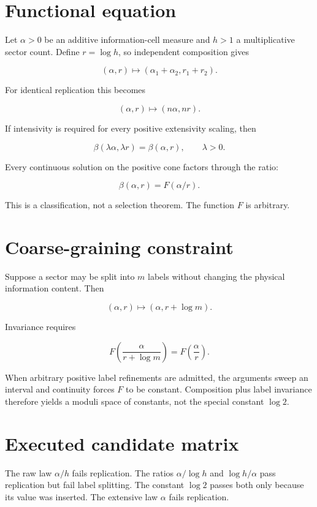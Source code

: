 \documentclass[11pt,a4paper,openany]{report}
\begin{document}
\section{Functional equation}

Let \(\alpha>0\) be an additive information-cell measure and \(h>1\) a multiplicative sector count. Define \(r=\log h\), so independent composition gives

\[
(\alpha,r)\mapsto(\alpha_1+\alpha_2,r_1+r_2).
\]

For identical replication this becomes

\[
(\alpha,r)\mapsto(n\alpha,nr).
\]

If intensivity is required for every positive extensivity scaling, then

\[
\beta(\lambda\alpha,\lambda r)=\beta(\alpha,r),
\qquad\lambda>0.
\]

Every continuous solution on the positive cone factors through the ratio:

\[
\beta(\alpha,r)=F(\alpha/r).
\]

This is a classification, not a selection theorem. The function \(F\) is arbitrary.

\section{Coarse-graining constraint}

Suppose a sector may be split into \(m\) labels without changing the physical information content. Then

\[
(\alpha,r)\mapsto(\alpha,r+\log m).
\]

Invariance requires

\[
F\!\left(\frac{\alpha}{r+\log m}\right)
=F\!\left(\frac{\alpha}{r}\right).
\]

When arbitrary positive label refinements are admitted, the arguments sweep an interval and continuity forces \(F\) to be constant. Composition plus label invariance therefore yields a moduli space of constants, not the special constant \(\log2\).

\section{Executed candidate matrix}

The raw law \(\alpha/h\) fails replication. The ratios \(\alpha/\log h\) and \(\log h/\alpha\) pass replication but fail label splitting. The constant \(\log2\) passes both only because its value was inserted. The extensive law \(\alpha\) fails replication.
\end{document}
